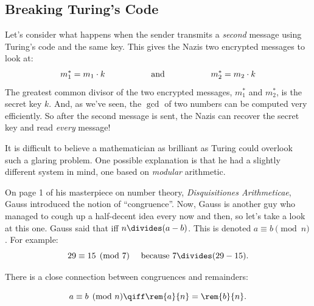 \subsection{Breaking Turing's Code}

Let's consider what happens when the sender transmits a
\textit{second} message using Turing's code and the same key.  This
gives the Nazis two encrypted messages to look at:
%
\[
m_1^* = m_1 \cdot k
\hspace{0.75in} \text{and} \hspace{0.75in}
m_2^* = m_2 \cdot k
\]
%
The greatest common divisor of the two encrypted messages, $m_1^*$ and
$m_2^*$, is the secret key $k$.  And, as we've seen, the $\gcd$ of two
numbers can be computed very efficiently.  So after the second message is
sent, the Nazis can recover the secret key and read \textit{every}
message!

It is difficult to believe a mathematician as brilliant as Turing
could overlook such a glaring problem.  One possible explanation is
that he had a slightly different system in mind, one based on
\textit{modular} arithmetic.



\label{sec:modular-arithmeric}


On page 1 of his masterpiece on number theory, {\em Disquisitiones
Arithmeticae}, Gauss introduced the notion of ``congruence''.  Now,
Gauss is another guy who managed to cough up a half-decent idea every
now and then, so let's take a look at this one.  Gauss said that
 iff $n \divides (a - b)$.  This
is denoted $a \equiv b \pmod{n}$.  For example:
%
\[
29 \equiv 15 \pmod{7}  \quad\text{ because }  7 \divides (29 - 15).
\]

There is a close connection between congruences and remainders:
\begin{lemma}
\label{lem:conrem}
\[
a \equiv b \pmod{n} \qiff \rem{a}{n} = \rem{b}{n}.
\]
\end{lemma}

